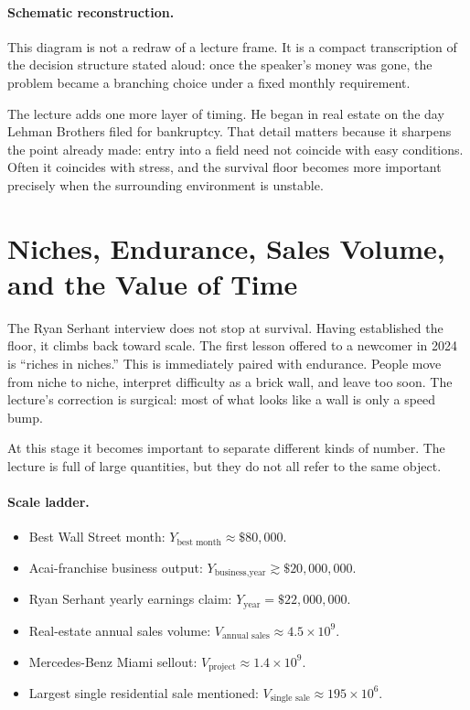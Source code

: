 \paragraph{Schematic reconstruction.} This diagram is not a redraw of a lecture frame. It is a compact transcription of the decision structure stated aloud: once the speaker's money was gone, the problem became a branching choice under a fixed monthly requirement.

The lecture adds one more layer of timing. He began in real estate on the day Lehman Brothers filed for bankruptcy. That detail matters because it sharpens the point already made: entry into a field need not coincide with easy conditions. Often it coincides with stress, and the survival floor becomes more important precisely when the surrounding environment is unstable.

\section{Niches, Endurance, Sales Volume, and the Value of Time}

The Ryan Serhant interview does not stop at survival. Having established the floor, it climbs back toward scale. The first lesson offered to a newcomer in 2024 is ``riches in niches.'' This is immediately paired with endurance. People move from niche to niche, interpret difficulty as a brick wall, and leave too soon. The lecture's correction is surgical: most of what looks like a wall is only a speed bump.

At this stage it becomes important to separate different kinds of number. The lecture is full of large quantities, but they do not all refer to the same object.

\paragraph{Scale ladder.}
\begin{itemize}
\item Best Wall Street month: \(Y_{\text{best month}} \approx \$80{,}000\).
\item Acai-franchise business output: \(Y_{\text{business,year}} \gtrsim \$20{,}000{,}000\).
\item Ryan Serhant yearly earnings claim: \(Y_{\text{year}} = \$22{,}000{,}000\).
\item Real-estate annual sales volume: \(V_{\text{annual sales}} \approx 4.5\times 10^{9}\).
\item Mercedes-Benz Miami sellout: \(V_{\text{project}} \approx 1.4\times 10^{9}\).
\item Largest single residential sale mentioned: \(V_{\text{single sale}} \approx 195\times 10^{6}\).
\end{itemize}

